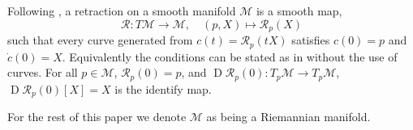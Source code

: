 \begin{definition}[Retraction]\label{def:retraction}
    Following \cite[Def.~3.47]{Boumal2023}, a retraction on a smooth manifold $\mathcal{M}$ is a smooth map,
    $$\mathcal{R}\colon T \mathcal{M}\xrightarrow{}\mathcal{M},\quad(p,X)\mapsto \mathcal{R}_{p}(X)$$
    such that every curve generated from $c(t)=\mathcal{R}_{p}(tX)$ satisfies $c(0)=p$ and $\dot{c}(0)=X$. Equivalently the conditions can be stated as in \cite[p.~40]{Boumal2023} without the use of curves. For all $p\in \mathcal{M}$, $\mathcal{R}_{p}(0)=p$, and $\operatorname{D}\mathcal{R}_{p}(0)\colon T_{p}\mathcal{M}\xrightarrow{}T_{p}\mathcal{M}$, $\operatorname{D}\mathcal{R}_{p}(0)[X]=X$ is the identify map. 
\end{definition}

\begin{definition}[]\label{def:}
    
\end{definition}

\begin{definition}[]\label{def:}
    
\end{definition}
    



For the rest of this paper we denote $\mathcal{M}$ as being a Riemannian manifold.










